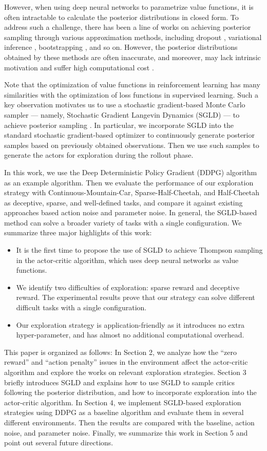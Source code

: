However, when using deep neural networks to parametrize value functions, it is often intractable to calculate the posterior distributions in closed form. To address such a challenge, there has been a line of works on achieving posterior sampling through various approximation methods, including dropout \cite{dropoutInference}, variational inference \cite{VIME}, bootstrapping \cite{BDQN}, and so on. However, the posterior distributions obtained by these methods are often inaccurate, and moreover, may lack intrinsic motivation and suffer high computational cost \cite{osband2018randomized}.

Note that the optimization of value functions in reinforcement learning has many similarities with the optimization of loss functions in supervised learning. Such a key observation motivates us to use a stochastic gradient-based Monte Carlo sampler --- namely, Stochastic Gradient Langevin Dynamics (SGLD) --- to achieve posterior sampling \cite{SGLD}. In particular, we incorporate SGLD into the standard stochastic gradient-based optimizer to continuously generate posterior samples based on previously obtained observations. Then we use such samples to generate the actors for exploration during the rollout phase.

In this work, we use the Deep Deterministic Policy Gradient (DDPG) algorithm \cite{DDPG} as an example algorithm. Then we evaluate the performance of our exploration strategy with Continuous-Mountain-Car, Sparse-Half-Cheetah, and Half-Cheetah as deceptive, sparse, and well-defined tasks, and compare it against existing approaches based action noise and parameter noise. In general, the SGLD-based method can solve a broader variety of tasks with a single configuration. We summarize three major highlights of this work:
\begin{itemize}
\item  It is the first time to propose the use of SGLD to achieve Thompson sampling in the actor-critic algorithm, which uses deep neural networks as value functions.
\item We identify two difficulties of exploration: sparse reward and deceptive reward. The experimental results prove that our strategy can solve different difficult tasks with a single configuration.
\item  Our exploration strategy is application-friendly as it introduces no extra hyper-parameter, and has almost no additional computational overhead. 
\end{itemize} 

This paper is organized as follows: In Section 2, we analyze how the “zero reward” and “action penalty” issues in the environment affect the actor-critic algorithm and explore the works on relevant exploration strategies. Section 3 briefly introduces SGLD and explains how to use SGLD to sample critics following the posterior distribution, and how to incorporate exploration into the actor-critic algorithm. In Section 4, we implement SGLD-based exploration strategies using DDPG as a baseline algorithm and evaluate them in several different environments. Then the results are compared with the baseline, action noise, and parameter noise. Finally, we summarize this work in Section 5 and point out several future directions.
